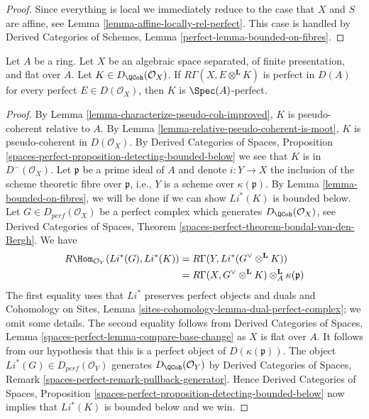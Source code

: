 \begin{proof}
Since everything is local we immediately reduce to the
case that $X$ and $S$ are affine, see Lemma
\ref{lemma-affine-locally-rel-perfect}.
This case is handled by
Derived Categories of Schemes, Lemma \ref{perfect-lemma-bounded-on-fibres}.
\end{proof}

\begin{lemma}
\label{lemma-characterize-relatively-perfect}
Let $A$ be a ring. Let $X$ be an algebraic space separated, of
finite presentation, and flat over $A$. Let $K \in D_\QCoh(\mathcal{O}_X)$.
If  $R \Gamma (X, E \otimes^\mathbf{L} K)$ is perfect in
$D(A)$ for every perfect $E \in D(\mathcal{O}_X)$, then $K$ is
$\Spec(A)$-perfect.
\end{lemma}

\begin{proof}
By Lemma \ref{lemma-characterize-pseudo-coh-improved},
$K$ is pseudo-coherent relative to $A$. By Lemma
\ref{lemma-relative-pseudo-coherent-is-moot},
$K$ is pseudo-coherent in $D(\mathcal{O}_X)$.
By Derived Categories of Spaces, Proposition
\ref{spaces-perfect-proposition-detecting-bounded-below}
we see that $K$ is in $D^-(\mathcal{O}_X)$.
Let $\mathfrak{p}$ be a prime ideal of $A$ and denote
$i : Y \to X$ the inclusion of the scheme theoretic
fibre over $\mathfrak{p}$, i.e., $Y$ is a scheme over $\kappa(\mathfrak p)$.
By Lemma \ref{lemma-bounded-on-fibres},
we will be done if we can show  $Li^*(K)$ is bounded below. 
Let $G \in D_{perf} (\mathcal{O}_X)$ be a perfect
complex which generates $D_\QCoh (\mathcal{O}_X)$,
see Derived Categories of Spaces, Theorem
\ref{spaces-perfect-theorem-bondal-van-den-Bergh}.
We have
\begin{align*}
R\Hom _{\mathcal{O}_Y}(Li^*(G), Li^*(K))
& =
R\Gamma(Y, Li^*(G ^\vee \otimes ^\mathbf{L} K)) \\
& =
R\Gamma(X, G^\vee \otimes ^{\mathbf{L}} K)
\otimes^\mathbf{L}_A \kappa(\mathfrak{p})
\end{align*}
The first equality uses that $Li^*$ preserves perfect objects and duals
and Cohomology on Sites, Lemma
\ref{sites-cohomology-lemma-dual-perfect-complex}; we omit
some details. The second equality follows from
Derived Categories of Spaces, Lemma
\ref{spaces-perfect-lemma-compare-base-change}
as $X$ is flat over $A$. It follows from our hypothesis that this is a
perfect object of $D(\kappa(\mathfrak{p}))$. The object
$Li^*(G) \in D_{perf}(\mathcal{O}_Y)$  generates $D_\QCoh(\mathcal{O}_Y)$ by
Derived Categories of Spaces, Remark
\ref{spaces-perfect-remark-pullback-generator}.
Hence Derived Categories of Spaces, Proposition
\ref{spaces-perfect-proposition-detecting-bounded-below}
now implies that $Li^*(K)$ is bounded below and we win.
\end{proof}














